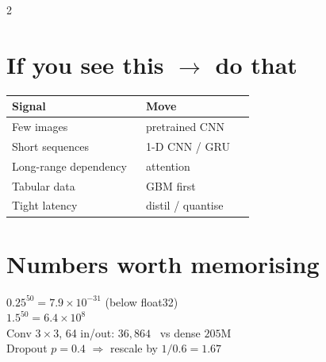 \documentclass[11pt,a4paper]{article}
\newcommand{\sect}[1]{\section*{#1}}
\begin{document}
\begin{multicols}{2}
\sect{If you see this $\rightarrow$ do that}
\begin{tabular}{@{}p{0.52\linewidth}p{0.42\linewidth}@{}}
\toprule
Signal & Move\\
\midrule
Few images & pretrained CNN\\
Short sequences & 1-D CNN / GRU\\
Long-range dependency & attention\\
Tabular data & GBM first\\
Tight latency & distil / quantise\\
\bottomrule
\end{tabular}


\sect{Numbers worth memorising}
$0.25^{50}=7.9\times10^{-31}$ (below float32)\\
$1.5^{50}=6.4\times10^{8}$\\
Conv $3\times3$, 64 in/out: $36{,}864$ \ vs dense $205$M\\
Dropout $p=0.4$ $\Rightarrow$ rescale by $1/0.6=1.67$

\end{multicols}
\end{document}
